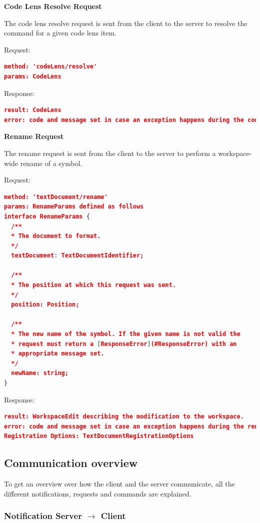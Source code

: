 \textbf{Code Lens Resolve Request}

The code lens resolve request is sent from the client to the server to resolve the command for a given code lens item.

Request:
\begin{lstlisting}[language=json,firstnumber=1]
method: 'codeLens/resolve'
params: CodeLens
\end{lstlisting}

Response:
\begin{lstlisting}[language=json,firstnumber=1]
result: CodeLens
error: code and message set in case an exception happens during the code lens resolve request.
\end{lstlisting}

\textbf{Rename Request}

The rename request is sent from the client to the server to perform a workspace-wide rename of a symbol.

Request:
\begin{lstlisting}[language=json,firstnumber=1]
method: 'textDocument/rename'
params: RenameParams defined as follows
interface RenameParams {
  /**
  * The document to format.
  */
  textDocument: TextDocumentIdentifier;

  /**
  * The position at which this request was sent.
  */
  position: Position;

  /**
  * The new name of the symbol. If the given name is not valid the
  * request must return a [ResponseError](#ResponseError) with an
  * appropriate message set.
  */
  newName: string;
}
\end{lstlisting}
Response:
\begin{lstlisting}[language=json,firstnumber=1]
result: WorkspaceEdit describing the modification to the workspace.
error: code and message set in case an exception happens during the rename request.
Registration Options: TextDocumentRegistrationOptions
\end{lstlisting}

\subsection{Communication overview}\label{custom commands}
To get an overview over how the client and the server communicate, all the different notifications, requests and commands are explained. 


\subsubsection{Notification Server $\longrightarrow$ Client}

